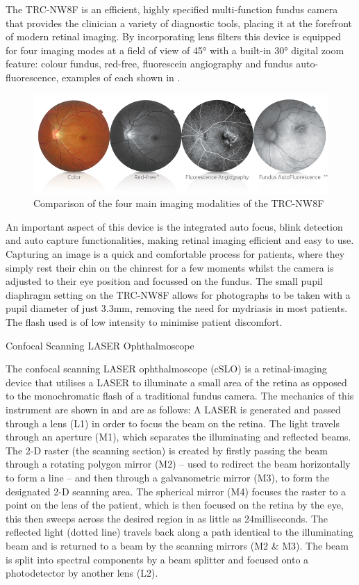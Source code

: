 The TRC-NW8F is an efficient, highly specified multi-function fundus camera that provides the clinician a variety of diagnostic tools, placing it at the forefront of modern retinal imaging. By incorporating lens filters this device is equipped for four imaging modes at a field of view of 45° with a built-in 30° digital zoom feature: colour fundus, red-free, fluorescein angiography and fundus auto-fluorescence, examples of each shown in .

\begin{figure}[htbp]
\centering
  \includegraphics{figures/imagingmodes}
\caption{Comparison of the four main imaging modalities of the TRC-NW8F}
\label{fig:im}
\end{figure}


An important aspect of this device is the integrated auto focus, blink detection and auto capture functionalities, making retinal imaging efficient and easy to use. Capturing an image is a quick and comfortable process for patients, where they simply rest their chin on the chinrest for a few moments whilst the camera is adjusted to their eye position and focussed on the fundus. The small pupil diaphragm setting on the TRC-NW8F allows for photographs to be taken with a pupil diameter of just 3.3mm, removing the need for mydriasis in most patients. The flash used is of low intensity to minimise patient discomfort. 


Confocal Scanning LASER Ophthalmoscope

The confocal scanning LASER ophthalmoscope (cSLO) is a retinal-imaging device that utilises a LASER to illuminate a small area of the retina as opposed to the monochromatic flash of a traditional fundus camera. The mechanics of this instrument are shown in and are as follows: A LASER is generated and passed through a lens (L1) in order to focus the beam on the retina. The light travels through an aperture (M1), which separates the illuminating and reflected beams. The 2-D raster (the scanning section) is created by firstly passing the beam through a rotating polygon mirror (M2) – used to redirect the beam horizontally to form a line – and then through a galvanometric mirror (M3), to form the designated 2-D scanning area. The spherical mirror (M4) focuses the raster to a point on the lens of the patient, which is then focused on the retina by the eye, this then sweeps across the desired region in as little as 24milliseconds. The reflected light (dotted line) travels back along a path identical to the illuminating beam and is returned to a beam by the scanning mirrors (M2 & M3). The beam is split into spectral components by a beam splitter and focused onto a photodetector by another lens (L2). 

